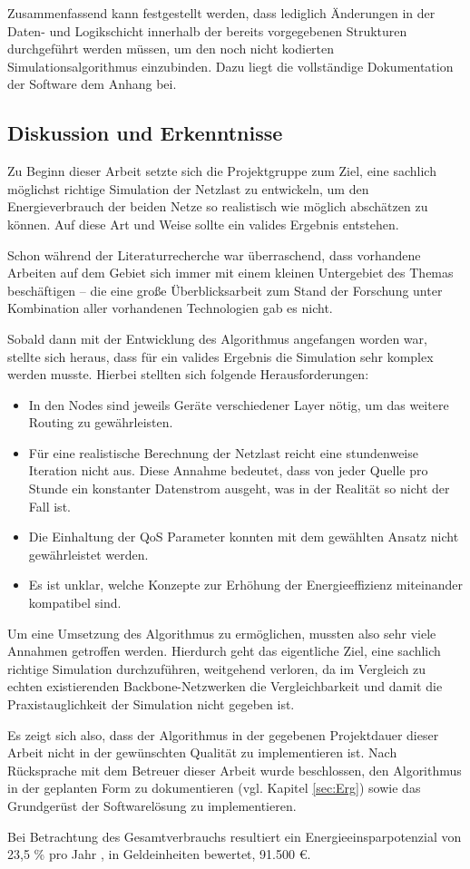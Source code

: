 Zusammenfassend kann festgestellt werden, dass lediglich Änderungen in der Daten- und Logikschicht innerhalb der bereits vorgegebenen Strukturen durchgeführt werden müssen, um den noch nicht kodierten Simulationsalgorithmus einzubinden. Dazu liegt die vollständige Dokumentation der Software dem Anhang bei.


\subsection{Diskussion und Erkenntnisse} \label{subsec:ErgDiskussion}
Zu Beginn dieser Arbeit setzte sich die Projektgruppe zum Ziel, eine sachlich möglichst richtige Simulation der Netzlast zu entwickeln, um den Energieverbrauch der beiden Netze so realistisch wie möglich abschätzen zu können. Auf diese Art und Weise sollte ein valides Ergebnis entstehen.

Schon während der Literaturrecherche war überraschend, dass vorhandene Arbeiten auf dem Gebiet sich immer mit einem kleinen Untergebiet des Themas beschäftigen -- die eine große Überblicksarbeit zum Stand der Forschung unter Kombination aller vorhandenen Technologien gab es nicht.

Sobald dann mit der Entwicklung des Algorithmus angefangen worden war, stellte sich heraus, dass für ein valides Ergebnis die Simulation sehr komplex werden musste. Hierbei stellten sich folgende Herausforderungen:
\begin{itemize}
	\item In den Nodes sind jeweils Geräte verschiedener Layer nötig, um das weitere Routing zu gewährleisten. 
	\item Für eine realistische Berechnung der Netzlast reicht eine stundenweise Iteration nicht aus. Diese Annahme bedeutet, dass von jeder Quelle pro Stunde ein konstanter Datenstrom ausgeht, was in der Realität so nicht der Fall ist.
	\item Die Einhaltung der QoS Parameter konnten mit dem gewählten Ansatz nicht ge\-währ\-lei\-stet werden.
	\item Es ist unklar, welche Konzepte zur Erhöhung der Energieeffizienz miteinander kompatibel sind.
\end{itemize}

Um eine Umsetzung des Algorithmus zu ermöglichen, mussten also sehr viele Annahmen getroffen werden. Hierdurch geht das eigentliche Ziel, eine sachlich richtige Simulation durchzuführen, weitgehend verloren, da im Vergleich zu echten existierenden Backbone-Netzwerken die Vergleichbarkeit und damit die Praxistauglichkeit der Simulation nicht gegeben ist.

Es zeigt sich also, dass der Algorithmus in der gegebenen Projektdauer dieser Arbeit nicht in der gewünschten Qualität zu implementieren ist. Nach Rücksprache mit dem Betreuer dieser Arbeit wurde beschlossen, den Algorithmus in der geplanten Form zu dokumentieren (vgl. Kapitel \ref{sec:Erg}) sowie das Grundgerüst der Softwarelösung zu implementieren. 

Bei Betrachtung des Gesamtverbrauchs resultiert ein Energieeinsparpotenzial von 23,5 \% pro Jahr  \cite[5]{Chiaraviglio2009}, in Geldeinheiten\cite{Proteus2016} bewertet, 91.500 €. 